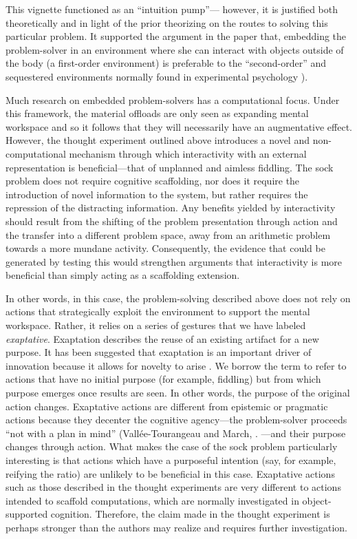 \documentclass{article}
\begin{document}
This vignette functioned as an “intuition pump”— however, it is justified both theoretically and in light of the prior theorizing on the routes to solving this particular problem. It supported the argument in the paper that, embedding the problem-solver in an environment where she can interact with objects outside of the body (a first-order environment) is preferable to the “second-order” and sequestered environments normally found in experimental psychology \parencite{Vallée-Tourangeau2020, Vallée-Tourangeau2014}). 

Much research on embedded problem-solvers has a computational focus. Under this framework, the material offloads are only seen as expanding mental workspace and so it follows that they will necessarily have an augmentative effect. However, the thought experiment outlined above introduces a novel and non-computational mechanism through which interactivity with an external representation is beneficial—that of unplanned and aimless fiddling. The sock problem does not require cognitive scaffolding, nor does it require the introduction of novel information to the system, but rather requires the repression of the distracting information. Any benefits yielded by interactivity should result from the shifting of the problem presentation through action and the transfer into a different problem space, away from an arithmetic problem towards a more mundane activity. Consequently, the evidence that could be generated by testing this would strengthen arguments that interactivity is more beneficial than simply acting as a scaffolding extension. 

In other words, in this case, the problem-solving described above does not rely on actions that strategically exploit the environment to support the mental workspace. Rather, it relies on a series of gestures that we have labeled \emph{exaptative}. Exaptation describes the reuse of an existing artifact for a new purpose. It has been suggested that exaptation is an important driver of innovation because it allows for novelty to arise \parencite{Andriani2017}. We borrow the term to refer to actions that have no initial purpose (for example, fiddling) but from which purpose emerges once results are seen. In other words, the purpose of the original action changes. Exaptative actions are different from epistemic or pragmatic actions \parencite{Kirsh1994} because they decenter the cognitive agency—the problem-solver proceeds “not with a plan in mind” (Vallée-Tourangeau and March, \parencite[3][]{Vallée-Tourangeau2019}. —and their purpose changes through action. What makes the case of the sock problem particularly interesting is that actions which have a purposeful intention (say, for example, reifying the ratio) are unlikely to be beneficial in this case. Exaptative actions such as those described in the thought experiments are very different to actions intended to scaffold computations, which are normally investigated in object-supported cognition. Therefore, the claim made in the thought experiment is perhaps stronger than the authors may realize and requires further investigation.
\end{document}
